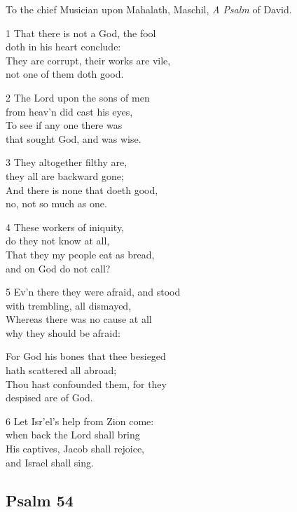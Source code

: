 To the chief Musician upon Mahalath, Maschil,
\emph{A Psalm} of David.

1 That there is not a God, the fool\\
doth in his heart conclude:\\
They are corrupt, their works are vile,\\
not one of them doth good.

2 The Lord upon the sons of men\\
from heav’n did cast his eyes,\\
To see if any one there was\\
that sought God, and was wise.

3 They altogether filthy are,\\
they all are backward gone;\\
And there is none that doeth good,\\
no, not so much as one.

4 These workers of iniquity,\\
do they not know at all,\\
That they my people eat as bread,\\
and on God do not call?

5 Ev’n there they were afraid, and stood\\
with trembling, all dismayed,\\
Whereas there was no cause at all\\
why they should be afraid:

For God his bones that thee besieged\\
hath scattered all abroad;\\
Thou hast confounded them, for they\\
despised are of God.

6 Let Isr’el’s help from Zion come:\\
when back the Lord shall bring\\
His captives, Jacob shall rejoice,\\
and Israel shall sing.


\begin{center}
\quad{}\quad{}
\end{center}

\subsection*{Psalm 54}

